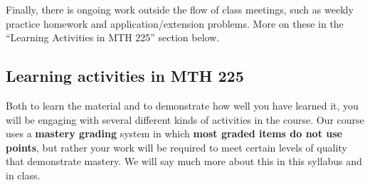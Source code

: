 \documentclass[]{article}
\begin{document}
Finally, there is ongoing work outside the flow of class meetings, such
as weekly practice homework and application/extension problems. More on
these in the ``Learning Activities in MTH 225'' section below.

\hypertarget{learning-activities-in-mth-225}{%
\subsection{Learning activities in MTH
225}\label{learning-activities-in-mth-225}}

Both to learn the material and to demonstrate how well you have learned
it, you will be engaging with several different kinds of activities in
the course. Our course uses a \textbf{mastery grading} system in which
\textbf{most graded items do not use points}, but rather your work will
be required to meet certain levels of quality that demonstrate mastery.
We will say much more about this in this syllabus and in class.
\end{document}
